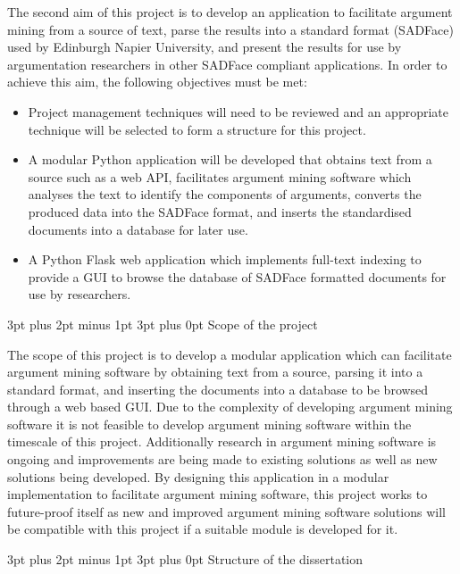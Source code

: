 \documentclass[12pt,a4paper]{article}
\makeatletter
\renewcommand\subsection{\@startsection {subsection}{1}{2mm} %
                               {3pt plus 2pt minus 1pt} %
                               {3pt plus 0pt} %
                               {\normalfont\bfseries}}
\makeatother
\begin{document}
The second aim of this project is to develop an application to facilitate argument mining from a source of text, parse the results into a standard format (SADFace) used by Edinburgh Napier University, and present the results for use by argumentation researchers in other SADFace compliant applications. In order to achieve this aim, the following objectives must be met:
\begin{itemize}
    \item Project management techniques will need to be reviewed and an appropriate technique will be selected to form a structure for this project.
    \item A modular Python application will be developed that obtains text from a source such as a web API, facilitates argument mining software which analyses the text to identify the components of arguments, converts the produced data into the SADFace format, and inserts the standardised documents into a database for later use.
    \item A Python Flask web application which implements full-text indexing to provide a GUI to browse the database of SADFace formatted documents for use by researchers.
\end{itemize}

\subsection{Scope of the project}

The scope of this project is to develop a modular application which can facilitate argument mining software by obtaining text from a source, parsing it into a standard format, and inserting the documents into a database to be browsed through a web based GUI. Due to the complexity of developing argument mining software it is not feasible to develop argument mining software within the timescale of this project. Additionally research in argument mining software is ongoing and improvements are being made to existing solutions as well as new solutions being developed. By designing this application in a modular implementation to facilitate argument mining software, this project works to future-proof itself as new and improved argument mining software solutions will be compatible with this project if a suitable module is developed for it.

\subsection{Structure of the dissertation}
\end{document}
